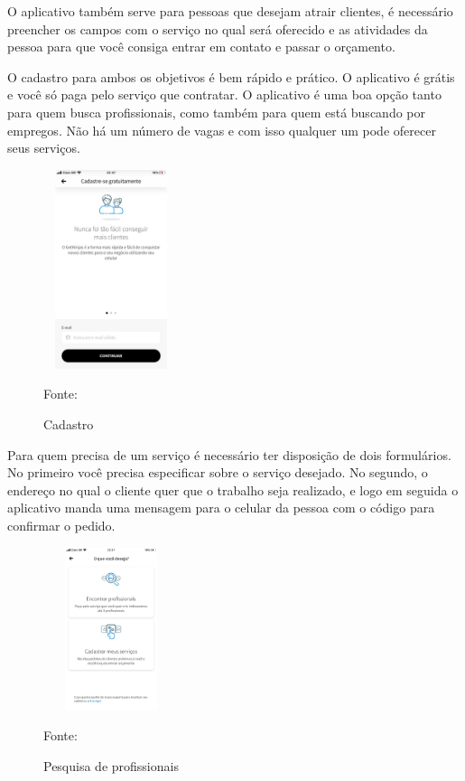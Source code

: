 O aplicativo também serve para pessoas que desejam atrair clientes, é necessário preencher os campos com o serviço no qual será oferecido e as atividades da pessoa para que você consiga entrar em contato e passar o orçamento.

O cadastro para ambos os objetivos é bem rápido e prático. O aplicativo é grátis e você só paga pelo serviço que contratar. O aplicativo é uma boa opção tanto para quem busca profissionais, como também para quem está buscando por empregos. Não há um número de vagas e com isso qualquer um pode oferecer seus serviços.

\begin{figure}[!h]
	\centering
	\caption{Cadastro }
	\includegraphics[width=150px, height=220px]{./images/getNinjasMobile.jpeg}
	\par {Fonte: \cite{get-ninjasMobilea}}
\end{figure}

Para quem precisa de um serviço é necessário ter disposição de dois formulários. No primeiro você precisa especificar sobre o serviço desejado. No segundo, o endereço no qual o cliente quer que o trabalho seja realizado, e logo em seguida o aplicativo manda uma mensagem para o celular da pessoa com o código para confirmar o pedido.

\begin{figure}[!h]
	\centering
	\caption{Pesquisa de profissionais}
	\includegraphics[width=150px, height=180px]{./images/getNinjasMobile3.jpeg}
	\par {Fonte: \cite{get-ninjasMobilea}}
\end{figure}
\newpage

